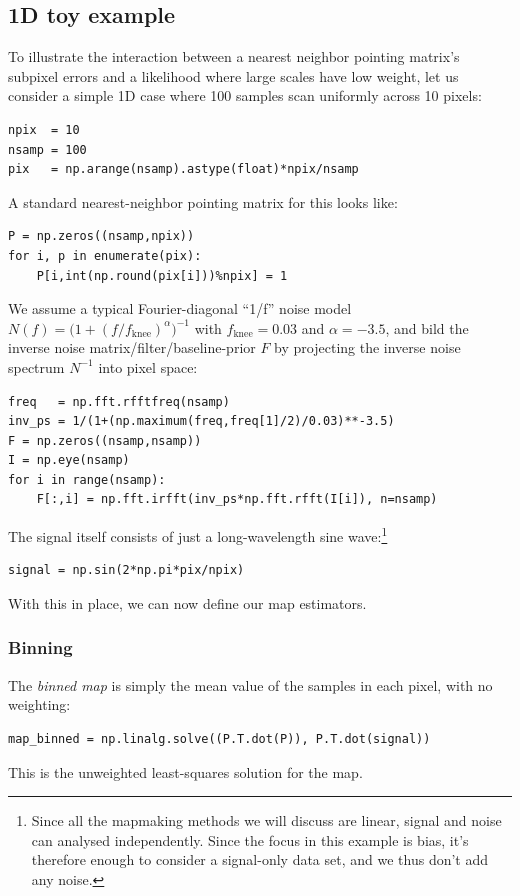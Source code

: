 \documentclass[twocolumn,apj]{aastex63}
\begin{document}
\subsection{1D toy example}
To illustrate the interaction between a nearest neighbor pointing matrix's
subpixel errors and a likelihood where large scales have low weight, let
us consider a simple 1D case where 100 samples scan uniformly across 10 pixels:
\begin{lstlisting}
npix  = 10
nsamp = 100
pix   = np.arange(nsamp).astype(float)*npix/nsamp
\end{lstlisting}
A standard nearest-neighbor pointing matrix for this looks like:
\begin{lstlisting}
P = np.zeros((nsamp,npix))
for i, p in enumerate(pix):
	P[i,int(np.round(pix[i]))%npix] = 1
\end{lstlisting}
We assume a typical Fourier-diagonal ``1/f'' noise model
$N(f) = \big(1+(f/f_\text{knee})^\alpha\big)^{-1}$
with $f_\text{knee}=0.03$ and $\alpha=-3.5$, and bild the
inverse noise matrix/filter/baseline-prior $F$ by
projecting the inverse noise spectrum $N^{-1}$ into pixel space:
\begin{lstlisting}
freq   = np.fft.rfftfreq(nsamp)
inv_ps = 1/(1+(np.maximum(freq,freq[1]/2)/0.03)**-3.5)
F = np.zeros((nsamp,nsamp))
I = np.eye(nsamp)
for i in range(nsamp):
	F[:,i] = np.fft.irfft(inv_ps*np.fft.rfft(I[i]), n=nsamp)
\end{lstlisting}
The signal itself consists of just a long-wavelength sine wave:\footnote{
Since all the mapmaking methods we will discuss are linear,
signal and noise can analysed independently. Since the focus
in this example is bias, it's therefore enough to consider a
signal-only data set, and we thus don't add any noise.}
\begin{lstlisting}
signal = np.sin(2*np.pi*pix/npix)
\end{lstlisting}

With this in place, we can now define our map estimators.

\subsubsection{Binning}
The \emph{binned map} is simply the mean value of the samples
in each pixel, with no weighting:
\begin{lstlisting}
map_binned = np.linalg.solve((P.T.dot(P)), P.T.dot(signal))
\end{lstlisting}
This is the unweighted least-squares solution for the map.
\end{document}
